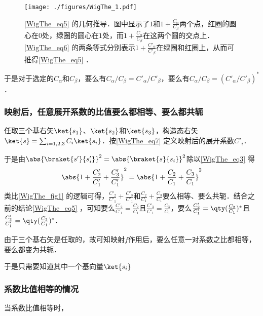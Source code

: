 \begin{figure}[ht]
\centering
\texttt{[image: ./figures/WigThe\_1.pdf]}
\caption{\autoref{WigThe_eq5} 的几何推导．图中显示了$1$和$1+\frac{C_\alpha}{C_\beta}$两个点，红圈的圆心在$0$处，绿圈的圆心在$1$处，而$1+\frac{C_\alpha}{C_\beta}$在这两个圆的交点上．\autoref{WigThe_eq6} 的两条等式分别表示$1+\frac{C'_\alpha}{C'_\beta}$在绿圈和红圈上，从而可推得\autoref{WigThe_eq5} ．} \label{WigThe_fig1}
\end{figure}

于是对于选定的$C_\alpha$和$C_\beta$，要么有$C_\alpha/C_\beta=C'_\alpha/C'_\beta$，要么有$C_\alpha/C_\beta=(C'_\alpha/C'_\beta)^*$．

\subsubsection{映射后，任意展开系数的比值要么都相等、要么都共轭}

任取三个基右矢$\ket{s_1}$、$\ket{s_2}$和$\ket{s_3}$，构造态右矢$\ket{s} = \sum_{i=1, 2, 3}C_i\ket{s_i}$．按\autoref{WigThe_eq7} 定义映射后的展开系数$C'_i$．

于是由$\abs{\braket{s'}{s'_i}}^2=\abs{\braket{s}{s_i}}^2$除以\autoref{WigThe_eq3} 得
\begin{equation}
\abs{1+\frac{C'_2}{C'_1}+\frac{C'_3}{C'_1}}^2 = \abs{1+\frac{C_2}{C_1}+\frac{C_3}{C_1}}^2
\end{equation}
类比\autoref{WigThe_fig1} 的逻辑可得，$\frac{C'_2}{C'_1}+\frac{C'_3}{C'_1}$和$\frac{C_2}{C_1}+\frac{C_3}{C_1}$要么相等、要么共轭．结合之前的结论\autoref{WigThe_eq5} ，可知要么$\frac{C'_2}{C'_1}=\frac{C_2}{C_1}$且$\frac{C'_3}{C'_1}=\frac{C_3}{C_1}$，要么$\frac{C'_2}{C'_1}=\qty(\frac{C_2}{C_1})^*$且$\frac{C'_3}{C'_1}=\qty(\frac{C_3}{C_1})^*$．

由于三个基右矢是任取的，故可知映射$f$作用后，要么任意一对系数之比都相等，要么都变为共轭．

于是只需要知道其中一个基向量$\ket{s_i}$


\subsubsection{系数比值相等的情况}

当系数比值相等时，











